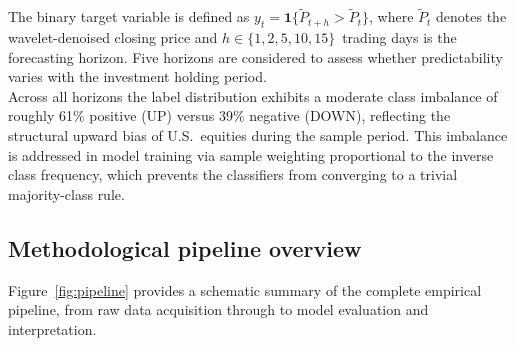\documentclass{rQUF2e}
\begin{document}
The binary target variable is defined as $y_t = \mathbf{1}\{\tilde{P}_{t+h} > \tilde{P}_t\}$, where $\tilde{P}_t$ denotes the wavelet-denoised closing price and $h \in \{1,2,5,10,15\}$~trading days is the forecasting horizon. Five horizons are considered to assess whether predictability varies with the investment holding period. \\

\noindent Across all horizons the label distribution exhibits a moderate class imbalance of roughly 61\% positive (UP) versus 39\% negative (DOWN), reflecting the structural upward bias of U.S.\ equities during the sample period. This imbalance is addressed in model training via sample weighting proportional to the inverse class frequency, which prevents the classifiers from converging to a trivial majority-class rule.

\subsection{Methodological pipeline overview}

Figure~\ref{fig:pipeline} provides a schematic summary of the complete empirical pipeline, from raw data acquisition through to model evaluation and interpretation.
\end{document}
